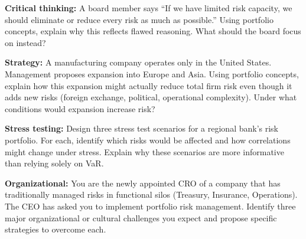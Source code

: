 \documentclass[11pt,openany]{book}
\begin{document}
\begin{discussionquestions}
\item \textbf{Critical thinking:} A board member says ``If we have limited
  risk capacity, we should eliminate or reduce every risk as much as
  possible.'' Using portfolio concepts, explain why this reflects flawed
  reasoning. What should the board focus on instead?

\item \textbf{Strategy:} A manufacturing company operates only in the United
  States. Management proposes expansion into Europe and Asia. Using portfolio
  concepts, explain how this expansion might actually reduce total firm risk
  even though it adds new risks (foreign exchange, political, operational
  complexity). Under what conditions would expansion increase risk?

\item \textbf{Stress testing:} Design three stress test scenarios for a
  regional bank's risk portfolio. For each, identify which risks would be
  affected and how correlations might change under stress. Explain why these
  scenarios are more informative than relying solely on VaR.

\item \textbf{Organizational:} You are the newly appointed CRO of a company
  that has traditionally managed risks in functional silos (Treasury,
  Insurance, Operations). The CEO has asked you to implement portfolio risk
  management. Identify three major organizational or cultural challenges you
  expect and propose specific strategies to overcome each.
\end{discussionquestions}
\end{document}
